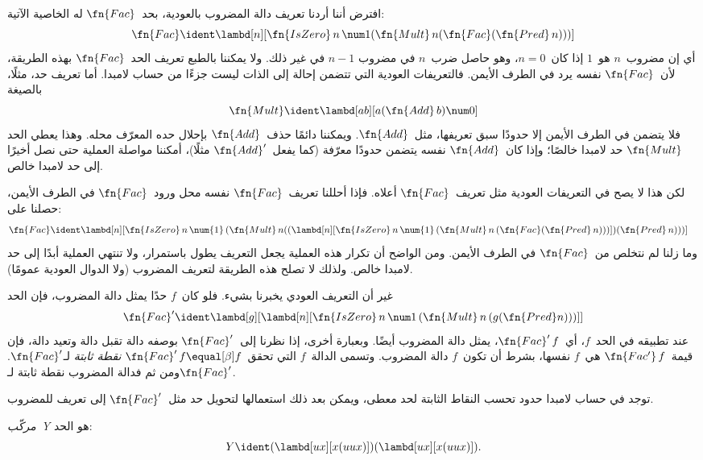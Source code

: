 \documentclass[../../../include/open-logic-section]{subfiles}
\begin{document}


افترض أننا أردنا تعريف دالة المضروب بالعودية، بحد~$\fn{Fac}$ له
الخاصية الآتية:
\[
\fn{Fac} \ident \lambd[n][\fn{IsZero}\, n\, \num 1 (\fn{Mult}\, n (\fn{Fac}(\fn{Pred} \, n)))]
\]
أي إن مضروب~$n$ هو~$1$ إذا كان~$n = 0$، وهو حاصل ضرب~$n$ في مضروب
$n-1$ في غير ذلك. ولا يمكننا بالطبع تعريف الحد~$\fn{Fac}$ بهذه
الطريقة، لأن~$\fn{Fac}$ نفسه يرد في الطرف الأيمن. فالتعريفات العودية
التي تتضمن إحالة إلى الذات ليست جزءًا من حساب لامبدا. أما تعريف حد،
مثلًا، بالصيغة
\[
\fn{Mult} \ident \lambd[ab][a (\fn{Add}\, b) \num 0]
\]
فلا يتضمن في الطرف الأيمن إلا حدودًا سبق تعريفها، مثل~$\fn{Add}$.
ويمكننا دائمًا حذف~$\fn{Add}$ بإحلال حده المعرّف محله. وهذا يعطي الحد
$\fn{Mult}$ حد لامبدا خالصًا؛ وإذا كان~$\fn{Add}$ نفسه يتضمن حدودًا
معرّفة (كما يفعل~$\fn{Add}'$ مثلًا)، أمكننا مواصلة العملية حتى نصل
أخيرًا إلى حد لامبدا خالص.

لكن هذا لا يصح في التعريفات العودية مثل تعريف~$\fn{Fac}$ أعلاه. فإذا
أحللنا تعريف~$\fn{Fac}$ نفسه محل ورود~$\fn{Fac}$ في الطرف الأيمن،
حصلنا على:
\begin{align*}
  \fn{Fac} & \ident
  \lambd[n][\fn{IsZero}\, n\, \num{1}\,
    (\fn{Mult}\, n
      ((\lambd[n][\fn{IsZero}\, n\, \num{1}\,
        (\fn{Mult}\, n\, (\fn{Fac}(\fn{Pred}\, n)))])
      (\fn{Pred}\, n)))]
\end{align*}
وما زلنا لم نتخلص من~$\fn{Fac}$ في الطرف الأيمن. ومن الواضح أن تكرار
هذه العملية يجعل التعريف يطول باستمرار، ولا تنتهي العملية أبدًا إلى
حد لامبدا خالص. ولذلك لا تصلح هذه الطريقة لتعريف المضروب (ولا الدوال
العودية عمومًا).

غير أن التعريف العودي يخبرنا بشيء. فلو كان~$f$ حدًا يمثل دالة
المضروب، فإن الحد
\[
\fn{Fac}' \ident \lambd[g][\lambd[n][\fn{IsZero} \, n \, \num 1\, (\fn{Mult} \, n\, (g (\fn{Pred} n)))]]
\]
عند تطبيقه في الحد~$f$، أي~$\fn{Fac}'\,f$، يمثل دالة المضروب أيضًا.
وبعبارة أخرى، إذا نظرنا إلى~$\fn{Fac}'$ بوصفه دالة تقبل دالة وتعيد
دالة، فإن قيمة~$\fn{Fac'}\, f$ هي~$f$ نفسها، بشرط أن تكون~$f$ دالة
المضروب. وتسمى الدالة~$f$ التي تحقق~$\fn{Fac}' \, f \equal[\beta] f$
\emph{نقطة ثابتة} لـ$\fn{Fac}'$. ومن ثم فدالة المضروب نقطة ثابتة
لـ$\fn{Fac}'$.

توجد في حساب لامبدا حدود تحسب النقاط الثابتة لحد معطى، ويمكن بعد ذلك
استعمالها لتحويل حد مثل~$\fn{Fac}'$ إلى تعريف للمضروب.

\begin{defn}
  \emph{مركّب~Y} هو الحد:
  \[
  Y \ident (\lambd[ux][x(uux)])(\lambd[ux][x(uux)]).
  \]
\end{defn}
\end{document}
